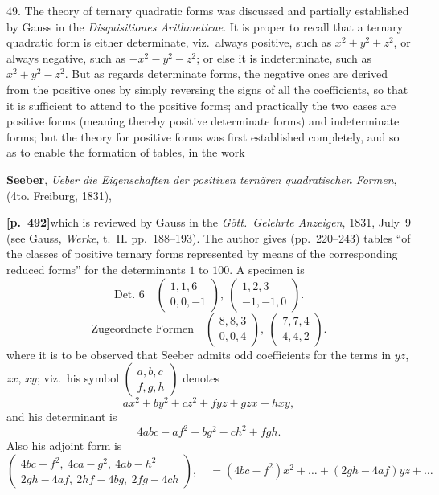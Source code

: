 \documentclass[11pt,a4paper]{article}
\begin{document}
49. The theory of ternary quadratic forms was discussed and partially established by Gauss in the \textit{Disquisitiones Arithmeticae}. It is proper to recall that a ternary quadratic form is either determinate, viz.\ always positive, such as $x^{2} + y^{2} + z^{2}$, or always negative, such as $-x^{2} - y^{2} - z^{2}$; or else it is indeterminate, such as $x^{2} + y^{2} - z^{2}$. But as regards determinate forms, the negative ones are derived from the positive ones by simply reversing the signs of all the coefficients, so that it is sufficient to attend to the positive forms; and practically the two cases are positive forms (meaning thereby positive determinate forms) and indeterminate forms; but the theory for positive forms was first established completely, and so as to enable the formation of tables, in the work

\textbf{Seeber}, \textit{Ueber die Eigenschaften der positiven tern\"aren quadratischen Formen}, (4to. Freiburg, 1831),

\noindent\textbf{[p.~492]}\quad which is reviewed by Gauss in the \textit{G\"ott.\ Gelehrte Anzeigen}, 1831, July~9 (see Gauss, \textit{Werke}, t.~II. pp.~188--193). The author gives (pp.~220--243) tables ``of the classes of positive ternary forms represented by means of the corresponding reduced forms'' for the determinants $1$ to $100$. A specimen is
\[
\text{Det.~6}\quad \left(\begin{array}{ccc}1, 1, 6 \\ 0, 0, -1\end{array}\right),\ \left(\begin{array}{ccc}1, 2, 3 \\ -1, -1, 0\end{array}\right).
\]
\[
\text{Zugeordnete Formen}\quad \left(\begin{array}{ccc}8, 8, 3 \\ 0, 0, 4\end{array}\right),\ \left(\begin{array}{ccc}7, 7, 4 \\ 4, 4, 2\end{array}\right).
\]
where it is to be observed that Seeber admits odd coefficients for the terms in $yz$, $zx$, $xy$; viz.\ his symbol $\left(\begin{array}{ccc}a, b, c \\ f, g, h\end{array}\right)$ denotes
\[
ax^{2} + by^{2} + cz^{2} + fyz + gzx + hxy,
\]
and his determinant is
\[
4abc - af^{2} - bg^{2} - ch^{2} + fgh.
\]
Also his adjoint form is
\[
\left(\begin{array}{c}4bc - f^{2},\ 4ca - g^{2},\ 4ab - h^{2} \\ 2gh - 4af,\ 2hf - 4bg,\ 2fg - 4ch\end{array}\right),\quad =(4bc - f^{2})x^{2} + \ldots + (2gh - 4af)yz + \ldots
\]
\end{document}
